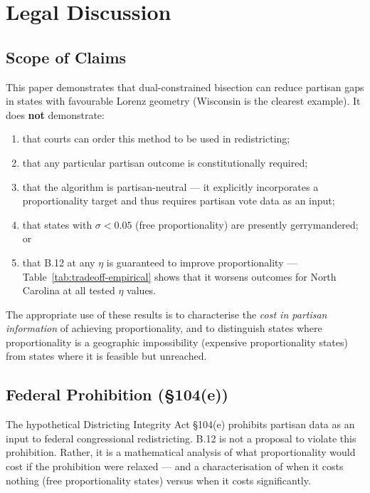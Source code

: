 \section{Legal Discussion}
\label{sec:legal}

\subsection{Scope of Claims}
\label{sec:legal:scope}

This paper demonstrates that dual-constrained bisection can reduce partisan
gaps in states with favourable Lorenz geometry (Wisconsin is the clearest
example).
It does \textbf{not} demonstrate:
\begin{enumerate}
  \item that courts can order this method to be used in redistricting;
  \item that any particular partisan outcome is constitutionally required;
  \item that the algorithm is partisan-neutral --- it explicitly incorporates
    a proportionality target and thus requires partisan vote data as an input;
  \item that states with $\sigma < 0.05$ (free proportionality) are presently
    gerrymandered; or
  \item that B.12 at any $\eta$ is guaranteed to improve proportionality ---
    Table~\ref{tab:tradeoff-empirical} shows that it worsens outcomes for North
    Carolina at all tested $\eta$ values.
\end{enumerate}
The appropriate use of these results is to characterise the \emph{cost in
partisan information} of achieving proportionality, and to distinguish states
where proportionality is a geographic impossibility (expensive proportionality
states) from states where it is feasible but unreached.

\subsection{Federal Prohibition (\S104(e))}

The hypothetical Districting Integrity Act \S104(e) prohibits partisan data
as an input to federal congressional redistricting.
B.12 is not a proposal to violate this prohibition.
Rather, it is a mathematical analysis of what proportionality would cost if
the prohibition were relaxed --- and a characterisation of when it costs nothing
(free proportionality states) versus when it costs significantly.

